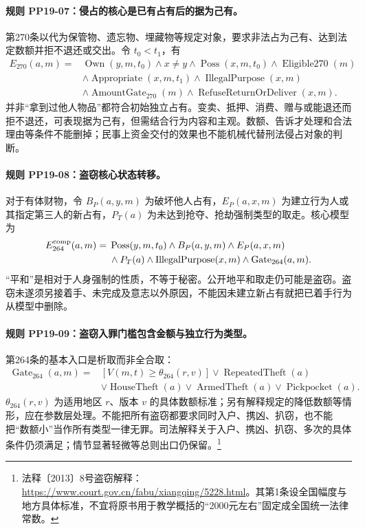 \paragraph{规则 PP19-07：侵占的核心是已有占有后的据为己有。}
\mbox{}\par
第270条以代为保管物、遗忘物、埋藏物等规定对象，要求非法占为己有、达到法定数额并拒不退还或交出。令 $t_0<t_1$，有
\[
\begin{aligned}
E_{270}(a,m)={}&\operatorname{Own}(y,m,t_0)\land x\ne y
\land\operatorname{Poss}(x,m,t_0)\land\operatorname{Eligible270}(m)\\
&\land\operatorname{Appropriate}(x,m,t_1)
\land\operatorname{IllegalPurpose}(x,m)\\
&\land\operatorname{AmountGate}_{270}(m)
\land\operatorname{RefuseReturnOrDeliver}(x,m).
\end{aligned}
\]
并非“拿到过他人物品”都符合初始独立占有。变卖、抵押、消费、赠与或能退还而拒不退还，可表现据为己有，但需结合行为内容和主观。数额、告诉才处理和合法理由等条件不能删掉；民事上资金交付的效果也不能机械代替刑法侵占对象的判断。

\paragraph{规则 PP19-08：盗窃核心状态转移。}
\mbox{}\par
对于有体财物，令 ${B_P}(a,y,m)$ 为破坏他人占有，${E_P}(a,x,m)$ 为建立行为人或其指定第三人的新占有，${P_T}(a)$ 为未达到抢夺、抢劫强制类型的取走。核心模型为
\[
\begin{aligned}
E_{264}^{\rm comp}(a,m)={}&\operatorname{Poss}(y,m,t_0)
\land{B_P}(a,y,m)
\land{E_P}(a,x,m)\\
&\land{P_T}(a)
\land\operatorname{IllegalPurpose}(x,m)
\land\operatorname{Gate}_{264}(a,m).
\end{aligned}
\]
“平和”是相对于人身强制的性质，不等于秘密。公开地平和取走仍可能是盗窃。盗窃未遂须另接着手、未完成及意志以外原因，不能因未建立新占有就把已着手行为从模型中删除。

\paragraph{规则 PP19-09：盗窃入罪门槛包含金额与独立行为类型。}
\mbox{}\par
第264条的基本入口是析取而非全合取：
\[
\begin{aligned}
\operatorname{Gate}_{264}(a,m)={}&[V(m,t)\ge\theta_{264}(r,v)]
\lor\operatorname{RepeatedTheft}(a)\\
&\lor\operatorname{HouseTheft}(a)
\lor\operatorname{ArmedTheft}(a)
\lor\operatorname{Pickpocket}(a).
\end{aligned}
\]
$\theta_{264}(r,v)$ 为适用地区 $r$、版本 $v$ 的具体数额标准；另有解释规定的降低数额等情形，应在参数层处理。不能把所有盗窃都要求同时入户、携凶、扒窃，也不能把“数额小”当作所有类型一律无罪。司法解释关于入户、携凶、扒窃、多次的具体条件仍须满足；情节显著轻微等总则出口仍保留。\footnote{法释〔2013〕8号盗窃解释：\url{https://www.court.gov.cn/fabu/xiangqing/5228.html}。其第1条设全国幅度与地方具体标准，不宜将原书用于教学概括的“2000元左右”固定成全国统一法律常数。}


